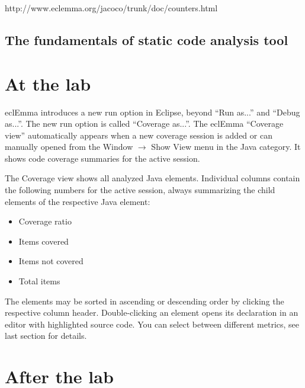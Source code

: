 \documentclass{scrreprt}
\begin{document}
http://www.eclemma.org/jacoco/trunk/doc/counters.html

\section{The fundamentals of static code analysis tool}

\chapter{At the lab} \label{sec:atlab}

eclEmma introduces a new run option in Eclipse, beyond ``Run as...'' and ``Debug as...''. The new run option is called ``Coverage as...''. The eclEmma ``Coverage view'' automatically appears when a new coverage session is added or can manually opened from the Window $\rightarrow$ Show View menu in the Java category. It shows code coverage summaries for the active session. 

The Coverage view shows all analyzed Java elements. Individual columns contain the following numbers for the active session, always summarizing the child elements of the respective Java element:

\begin{itemize}
\item Coverage ratio
\item Items covered
\item Items not covered
\item Total items
\end{itemize}

The elements may be sorted in ascending or descending order by clicking the respective column header. Double-clicking an element opens its declaration in an editor with highlighted source code. You can select between different metrics, see last section for details. 

\chapter{After the lab}
\end{document}

